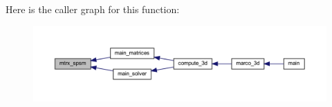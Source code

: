 Here is the caller graph for this function\+:
\nopagebreak
\begin{figure}[H]
\begin{center}
\leavevmode
\includegraphics[width=350pt]{Marco_8f90_a6af8c7cf82dc910740ea6b8565200037_icgraph}
\end{center}
\end{figure}
\mbox{\label{Marco_8f90_a9b8cd7f2e81c5d270b9963c9f3f80f67}} 
